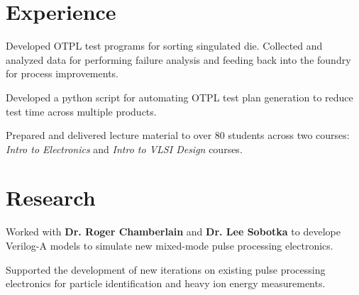 \documentclass[]{deedy-resume-openfont}
\begin{document}
\begin{minipage}[t]{0.66\textwidth} 


\section{Experience}
\vspace{\topsep} %
\begin{tightemize}
\item Developed OTPL test programs for sorting singulated die. Collected and analyzed data for performing failure analysis and feeding back into the foundry for process improvements. 
\item Developed a python script for automating OTPL test plan generation to reduce test time across multiple products.
\end{tightemize}
\sectionsep

\begin{tightemize}
\item Prepared and delivered lecture material to over 80 students across two courses: \emph{Intro to Electronics} and \emph{Intro to VLSI Design} courses.
\end{tightemize}
\sectionsep


\section{Research}
\begin{tightemize}
\item Worked with \textbf{Dr. Roger Chamberlain} and \textbf{Dr. Lee Sobotka} to develope Verilog-A models to simulate new mixed-mode pulse processing electronics.
\item Supported the development of new iterations on existing pulse processing electronics for particle identification and heavy ion energy measurements.
\end{tightemize}
\sectionsep


\end{minipage}
\end{document}
